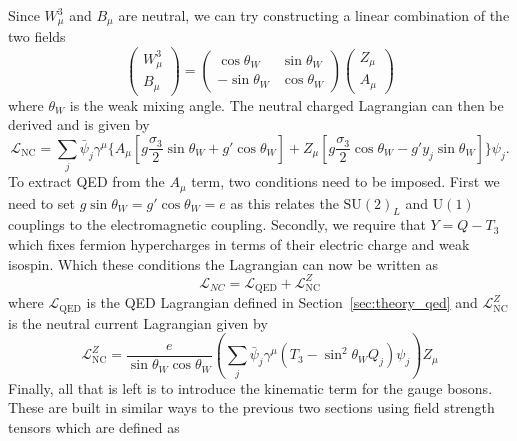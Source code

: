 Since $W^{3}_{\mu}$ and $B_{\mu}$ are neutral, we can try constructing a linear combination of the two fields
\begin{equation}
  \begin{pmatrix}
    W^{3}_{\mu}\\
    B_{\mu}
  \end{pmatrix} = \begin{pmatrix}
    \cos\theta_{W} & \sin\theta_{W} \\
    -\sin\theta_{W} & \cos\theta_{W}
  \end{pmatrix}
  \begin{pmatrix}
    Z_{\mu} \\
    A_{\mu}
  \end{pmatrix}
  \label{eq:ew_mixing}
\end{equation}
where $\theta_{W}$ is the weak mixing angle. The neutral charged Lagrangian can then be derived and is given by
\begin{equation}
  \mathcal{L}_{\mathrm{NC}} = \sum_{j}\bar{\psi}_{j}\gamma^{\mu} \{A_{\mu}[g\frac{\sigma_{3}}{2}\sin{\theta_{W}} + g'\cos{\theta_{W}}] + Z_{\mu}[g\frac{\sigma_{3}}{2}\cos{\theta_{W} - g'y_{j}\sin{\theta_{W}}}] \} \psi_{j}.
  \label{eq:ew_nc_lagrangian}
\end{equation}
To extract QED from the $A_{\mu}$ term, two conditions need to be imposed. First we need to set $g\sin{\theta_{W}} = g'\cos{\theta_{W}} = e$ as this relates the $\mathrm{SU}{(2)}_{L}$ and $\mathrm{U}(1)$ couplings to the electromagnetic coupling. Secondly, we require that $Y = Q - T_{3}$ which fixes fermion hypercharges in terms of their electric charge and weak isospin. Which these conditions the Lagrangian can now be written as
\begin{equation}
  \mathcal{L}_{NC} = \mathcal{L}_{\mathrm{QED}} + \mathcal{L}_{\mathrm{NC}}^{Z} 
\end{equation}
where $\mathcal{L}_{\mathrm{QED}}$ is the QED Lagrangian defined in Section~\ref{sec:theory_qed} and $\mathcal{L}_{\mathrm{NC}}^{Z}$ is the neutral current Lagrangian given by
\begin{equation}
  \mathcal{L}_{\mathrm{NC}}^{Z} = \frac{e}{\sin{\theta_{W}}\cos{\theta_{W}}} \left(\sum_{j}\bar{\psi}_{j}\gamma^{\mu}(T_{3} - \sin^2{\theta_{W}}Q_{j})\psi_{j}\right)Z_{\mu}
  \label{eq:ew_nc_lagrangian_z}
\end{equation}
Finally, all that is left is to introduce the kinematic term for the gauge bosons. These are built in similar ways to the previous two sections using field strength tensors which are defined as
